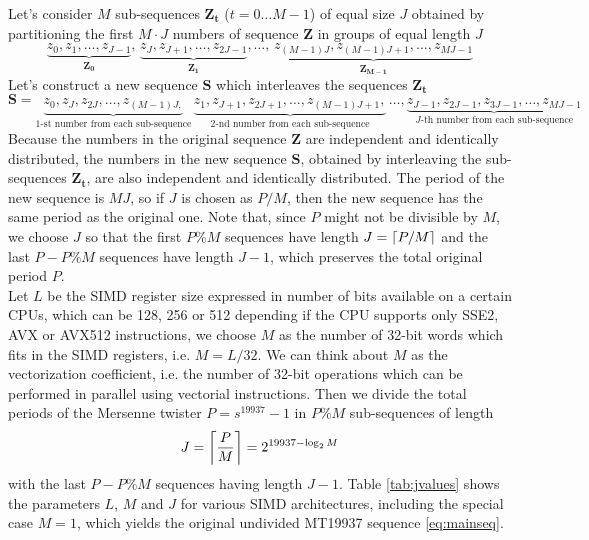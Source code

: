 \documentclass[preprint,1p,times]{elsarticle}
\begin{document}
	Let's consider $M$ sub-sequences $\boldsymbol{Z_t}$ ($t=0\dots M-1$) of equal size $J$ obtained by partitioning the first $M\cdot J$ numbers of sequence $\boldsymbol{Z}$ in groups of equal length $J$
	\begin{equation}
		\label{eq:subseq}
		\underbrace{z_0, z_1, \dots, z_{J-1}}_{\boldsymbol{Z_0}},\, \underbrace{z_J, z_{J+1}, \dots, z_{2J-1}}_{\boldsymbol{Z_1}}, \dots,\, \underbrace{z_{(M-1)J}, z_{(M-1)J+1}, \dots, z_{MJ-1}}_{\boldsymbol{Z_{M-1}}}
	\end{equation}
	Let's construct a new sequence $\boldsymbol{S}$ which interleaves the sequences $\boldsymbol{Z_t}$
	\begin{equation}
		\label{eq:combseq}
		\boldsymbol{S}=\underbrace{z_0, z_J, z_{2J}, \dots, z_{(M-1)J,}}_{\text{1-st number from each sub-sequence}} \,\underbrace{z_1, z_{J+1}, z_{2J+1}, \dots, z_{(M-1)J+1},}_{\text{2-nd number from each sub-sequence}}\, \dots, \underbrace{z_{J-1}, z_{2J-1}, z_{3J-1}, \dots, z_{MJ-1}}_{\text{$J$-th number from each sub-sequence}}
	\end{equation}
	Because the numbers in the original sequence $\boldsymbol{Z}$ are independent and identically distributed, the numbers in the new sequence $\boldsymbol{S}$, obtained by interleaving the sub-sequences $\boldsymbol{Z_t}$, are also independent and identically distributed. The period of the new sequence is $MJ$, so if $J$ is chosen as $P/M$, then the new sequence has the same period as the original one. Note that, since $P$ might not be divisible by $M$, we choose $J$ so that the first $P \% M$ sequences have length $J=\left\lceil{P/M}\right\rceil$ and the last $P - P \% M$ sequences have length $J-1$, which preserves the total original period $P$. \\
	
	Let $L$ be the SIMD register size expressed in number of bits available on a certain CPUs, which can be 128, 256 or 512 depending if the CPU supports only SSE2, AVX or AVX512 instructions, we choose $M$ as the number of 32-bit words which fits in the SIMD registers, i.e. $M=L/32$.
	We can think about $M$ as the vectorization coefficient, i.e. the number of 32-bit operations which can be performed in parallel using vectorial instructions.
	Then we divide the total periods of the Mersenne twister $P=s^{19937}-1$ in $P \% M$ sub-sequences of length
	$$J=\left\lceil{\frac{P}{M}}\right\rceil=2^{19937-\log_2M}$$
	with the last $P - P \% M$ sequences having length $J-1$. Table \ref{tab:jvalues} shows the parameters $L$, $M$ and $J$ for various SIMD architectures, including the special case $M=1$, which yields the original undivided MT19937 sequence \eqref{eq:mainseq}.
	
\end{document}
